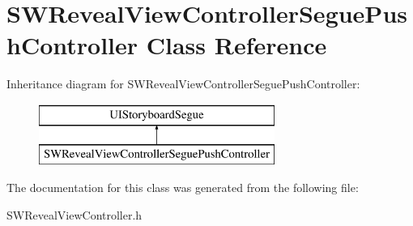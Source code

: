 \hypertarget{interface_s_w_reveal_view_controller_segue_push_controller}{}\section{S\+W\+Reveal\+View\+Controller\+Segue\+Push\+Controller Class Reference}
\label{interface_s_w_reveal_view_controller_segue_push_controller}
Inheritance diagram for S\+W\+Reveal\+View\+Controller\+Segue\+Push\+Controller\+:\begin{figure}[H]
\begin{center}
\leavevmode
\includegraphics[height=2.000000cm]{interface_s_w_reveal_view_controller_segue_push_controller}
\end{center}
\end{figure}


The documentation for this class was generated from the following file\+:\begin{DoxyCompactItemize}
\item 
S\+W\+Reveal\+View\+Controller.\+h\end{DoxyCompactItemize}
